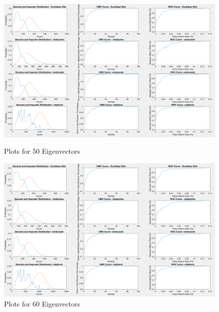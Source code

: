 \documentclass[10pt, letterpaper]{article}
\begin{document}
\begin{figure}
 \includegraphics[width=\linewidth]{images/for50coeff}
 \caption{ Plots for 50 Eigenvectors}
 \label{fig:50coeff}

  \includegraphics[width=\linewidth]{images/for60coeff}
 \caption{ Plots for 60 Eigenvectors}
 \label{fig:60coeff}
\end{figure}
\end{document}
